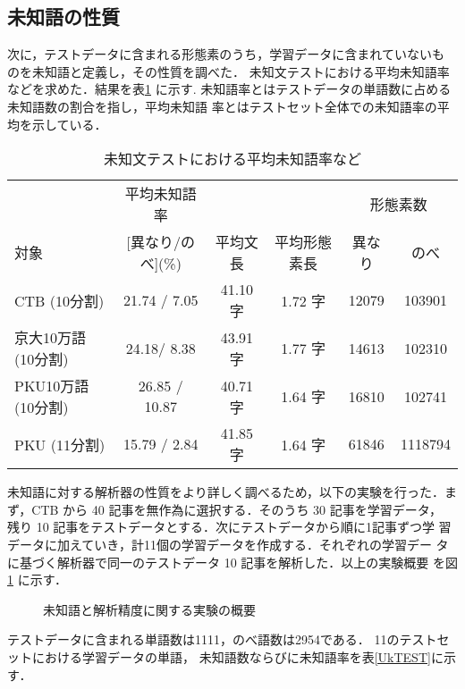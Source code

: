 \subsection{未知語の性質}
次に，テストデータに含まれる形態素のうち，学習データに含まれていないも
のを未知語と定義し，その性質を調べた．
未知文テストにおける平均未知語率などを求めた．結果を表\ref{OpenUnknown}
に示す.
未知語率とはテストデータの単語数に占める未知語数の割合を指し，平均未知語
率とはテストセット全体での未知語率の平均を示している．
\begin{table}[htb]
 \begin{center}
\caption{未知文テストにおける平均未知語率など}
\label{OpenUnknown}
  \begin{tabular}{l|ccccc}
\hline
                  & 平均未知語率    &        & &\multicolumn{2}{c}{形態素数}\\ 
対象      &[異なり/のべ](\%)& 平均文長& 平均形態素長 &異なり&のべ\\
\hline
CTB (10分割)      &21.74 / 7.05     & 41.10 字& 1.72 字      &12079&103901\\
京大10万語 (10分割)&24.18/ 8.38      & 43.91 字& 1.77 字
                  &14613&102310\\
PKU10万語 (10分割) &26.85 / 10.87     & 40.71 字& 1.64 字
                  &16810&102741\\
PKU (11分割) & 15.79 / 2.84        & 41.85 字& 1.64 字       &61846&1118794\\ 
\hline
  \end{tabular}
 \end{center}
\end{table}

未知語に対する解析器の性質をより詳しく調べるため，以下の実験を行った．ま
ず，CTB から 40 記事を無作為に選択する．そのうち 30 記事を学習データ，
残り 10 記事をテストデータとする．次にテストデータから順に1記事ずつ学
習データに加えていき，計11個の学習データを作成する．それぞれの学習デー
タに基づく解析器で同一のテストデータ 10 記事を解析した．以上の実験概要
を図\ref{UnknownWordExp} に示す．

\begin{figure}[htb]
\begin{center}
\epsfxsize=50mm
\caption{未知語と解析精度に関する実験の概要}
\label{UnknownWordExp}
\end{center}
\end{figure}

テストデータに含まれる単語数は1111，のべ語数は2954である．
11のテストセットにおける学習データの単語，
未知語数ならびに未知語率を表\ref{UkTEST}に示す．

